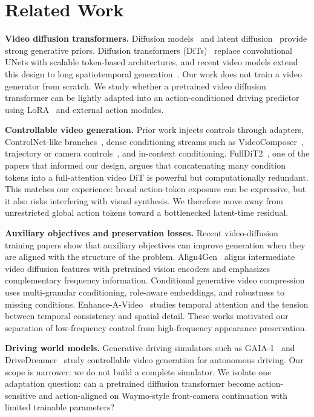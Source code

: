 \documentclass[10pt,twocolumn,letterpaper]{article}
\begin{document}
\section{Related Work}

\textbf{Video diffusion transformers.}
Diffusion models~\cite{ho2020ddpm} and latent diffusion~\cite{rombach2022ldm} provide strong generative priors. Diffusion transformers (DiTs)~\cite{peebles2023dit} replace convolutional UNets with scalable token-based architectures, and recent video models extend this design to long spatiotemporal generation~\cite{brooks2024sora,yang2024cogvideox,kong2024hunyuanvideo,ha2024ltx}. Our work does not train a video generator from scratch. We study whether a pretrained video diffusion transformer can be lightly adapted into an action-conditioned driving predictor using LoRA~\cite{hu2021lora} and external action modules.

\textbf{Controllable video generation.}
Prior work injects controls through adapters, ControlNet-like branches~\cite{zhang2023controlnet}, dense conditioning streams such as VideoComposer~\cite{wang2023videocomposer}, trajectory or camera controls~\cite{wang2024motionctrl}, and in-context conditioning. FullDiT2~\cite{he2025fulldit2}, one of the papers that informed our design, argues that concatenating many condition tokens into a full-attention video DiT is powerful but computationally redundant. This matches our experience: broad action-token exposure can be expressive, but it also risks interfering with visual synthesis. We therefore move away from unrestricted global action tokens toward a bottlenecked latent-time residual.

\textbf{Auxiliary objectives and preservation losses.}
Recent video-diffusion training papers show that auxiliary objectives can improve generation when they are aligned with the structure of the problem. Align4Gen~\cite{lee2025align4gen} aligns intermediate video diffusion features with pretrained vision encoders and emphasizes complementary frequency information. Conditional generative video compression~\cite{yi2025conditionalcompression} uses multi-granular conditioning, role-aware embeddings, and robustness to missing conditions. Enhance-A-Video~\cite{luo2025enhanceavideo} studies temporal attention and the tension between temporal consistency and spatial detail. These works motivated our separation of low-frequency control from high-frequency appearance preservation.

\textbf{Driving world models.}
Generative driving simulators such as GAIA-1~\cite{hu2023gaia1} and DriveDreamer~\cite{wang2023drivedreamer} study controllable video generation for autonomous driving. Our scope is narrower: we do not build a complete simulator. We isolate one adaptation question: can a pretrained diffusion transformer become action-sensitive and action-aligned on Waymo-style front-camera continuation with limited trainable parameters?
\end{document}

